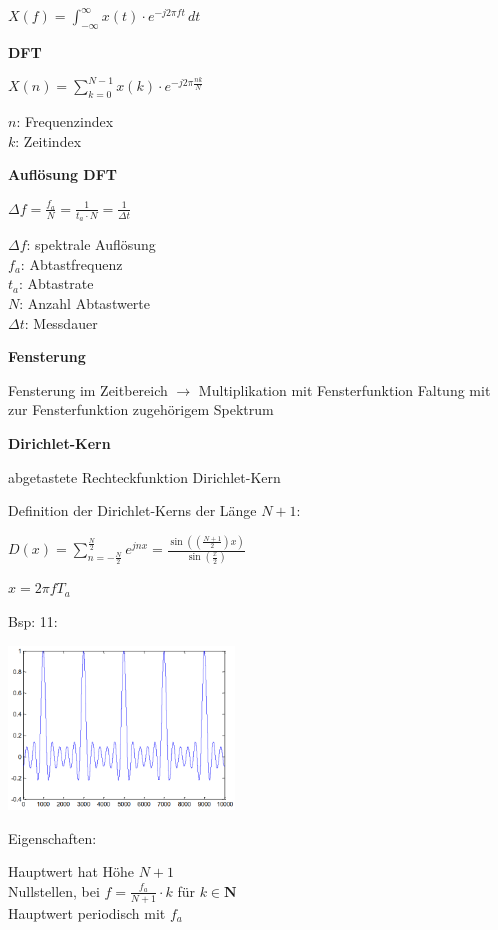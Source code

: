 $\displaystyle{
    X(f) = \int_{-\infty}^{\infty} x(t) \cdot e^{-j2\pi ft} \, dt
}$

\textbf{DFT}

$\displaystyle{
    X(n) = \sum_{k=0}^{N-1} x(k) \cdot e^{-j2\pi \frac{nk}{N}}
}$

$n$: Frequenzindex\\
$k$: Zeitindex

\textbf{Auflösung DFT}

$\displaystyle{
    \Delta f = \frac{f_a}{N} = \frac{1}{t_a \cdot N} = \frac{1}{\Delta t}
}$

$\Delta f$: spektrale Auflösung\\
$f_a$: Abtastfrequenz\\
$t_a$: Abtastrate\\
$N$: Anzahl Abtastwerte\\
$\Delta t$: Messdauer

\textbf{Fensterung}

Fensterung im Zeitbereich $\rightarrow$ Multiplikation mit Fensterfunktion \laplace \; Faltung mit zur Fensterfunktion zugehörigem Spektrum

\textbf{Dirichlet-Kern}

abgetastete Rechteckfunktion \laplace \; Dirichlet-Kern

Definition der Dirichlet-Kerns der Länge $N+1$:

$\displaystyle{
    D(x) = \sum_{n=-\frac{N}{2}}^{\frac{N}{2}} e^{jnx} =
    \frac{\sin\left( \left( \frac{N + 1}{2} \right) x \right)}{\sin\left( \frac{x}{2} \right)}
}$

$x = 2\pi fT_a$

Bsp: 11:

\includegraphics[width=6cm]{img/dirichlet-kern.png}

Eigenschaften:

Hauptwert hat Höhe $N+1$\\
Nullstellen, bei $\displaystyle{
    f = \frac{f_a}{N+1} \cdot k
}$ für
$\displaystyle{
    k \in \mathbf{N}
}$\\
Hauptwert periodisch mit $f_a$


